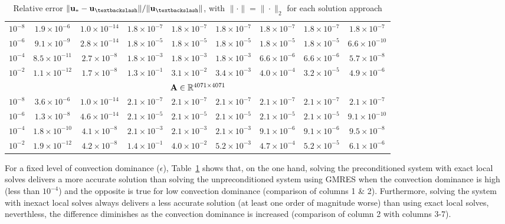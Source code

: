 \begin{table}[tbhp]
\begin{tabular}{r|cccccccc}
\hline
\multicolumn{1}{c|}{$10^{-8}$} & $1.9\times10^{-6}$ & $1.0\times10^{-14}$  & $1.8\times10^{-7}$  & $1.8\times10^{-7}$   & $1.8\times10^{-7}$ & $1.8\times10^{-7}$  & $1.8\times10^{-7}$   & $1.8\times10^{-7}$ \\
\multicolumn{1}{c|}{$10^{-6}$} & $9.1\times10^{-9}$ & $2.8\times10^{-14}$  & $1.8\times10^{-5}$  & $1.8\times10^{-5}$   & $1.8\times10^{-5}$ & $1.8\times10^{-5}$  & $1.8\times10^{-5}$   & $6.6\times10^{-10}$ \\
\multicolumn{1}{c|}{$10^{-4}$} & $8.5\times10^{-11}$ & $2.7\times10^{-8}$  & $1.8\times10^{-3}$  & $1.8\times10^{-3}$   & $1.8\times10^{-3}$ & $6.6\times10^{-6}$  & $6.6\times10^{-6}$   & $5.7\times10^{-8}$ \\
\multicolumn{1}{c|}{$10^{-2}$} & $1.1\times10^{-12}$ & $1.7\times10^{-8}$  & $1.3\times10^{-1}$  & $3.1\times10^{-2}$   & $3.4\times10^{-3}$ & $4.0\times10^{-4}$  & $3.2\times10^{-5}$   & $4.9\times10^{-6}$ \\
\hline
\hline
\multicolumn{9}{c}{$\mathbf{A}\in\mathbb{R}^{4071\times4071}$}\\
\hline
\multicolumn{1}{c|}{$10^{-8}$} & $3.6\times10^{-6}$ & $1.0\times10^{-14}$  & $2.1\times10^{-7}$  & $2.1\times10^{-7}$   & $2.1\times10^{-7}$ & $2.1\times10^{-7}$  & $2.1\times10^{-7}$   & $2.1\times10^{-7}$ \\
\multicolumn{1}{c|}{$10^{-6}$} & $1.3\times10^{-8}$ & $4.6\times10^{-14}$  & $2.1\times10^{-5}$  & $2.1\times10^{-5}$   & $2.1\times10^{-5}$ & $2.1\times10^{-5}$  & $2.1\times10^{-5}$   & $9.1\times10^{-10}$ \\
\multicolumn{1}{c|}{$10^{-4}$} & $1.8\times10^{-10}$ & $4.1\times10^{-8}$  & $2.1\times10^{-3}$  & $2.1\times10^{-3}$   & $2.1\times10^{-3}$ & $9.1\times10^{-6}$  & $9.1\times10^{-6}$   & $9.5\times10^{-8}$ \\
\multicolumn{1}{c|}{$10^{-2}$} & $1.9\times10^{-12}$ & $4.2\times10^{-8}$  & $1.4\times10^{-1}$  & $4.0\times10^{-2}$   & $5.2\times10^{-3}$ & $4.7\times10^{-4}$  & $5.2\times10^{-5}$   & $6.1\times10^{-6}$ \\
\end{tabular}
\caption{Relative error $\|\u_{*}-\u_{\textbackslash}\|/\|\u_{\textbackslash}\|$, with $\|\cdot\|=\|\cdot\|_{2}$ for each solution approach}
\label{tab:2D:GMRES.error.inexact.prec}
\end{table}
\pagebreak
For a fixed level of convection dominance ($\epsilon$), Table~\ref{tab:2D:GMRES.error.inexact.prec} shows that, on the one hand,  solving the preconditioned system with exact local solves delivers a more accurate solution than solving the unpreconditioned system using GMRES when the convection dominance is high (less than $10^{-4}$) and the opposite is true for low convection dominance (comparison of columns 1 \& 2). Furthermore, solving the system with inexact local solves always delivers a less accurate solution (at least one order of magnitude worse) than using exact local solves, neverthless, the difference diminishes as the convection dominance is increased (comparison of column 2 with columns 3-7).




